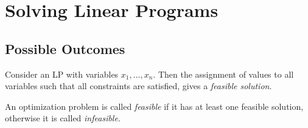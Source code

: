 \chapter{Solving Linear Programs}
\section{Possible Outcomes}
\begin{defbox}
    \begin{definition}
        Consider an LP with variables $x_1,\dots,x_n$.  Then the
        assignment of values to all variables such that all constraints are satisfied,
        gives a \emph{feasible solution}.

        An optimization problem is called \emph{feasible} if it has at least one feasible
        solution, otherwise it is called \emph{infeasible}.
    \end{definition}
\end{defbox}

